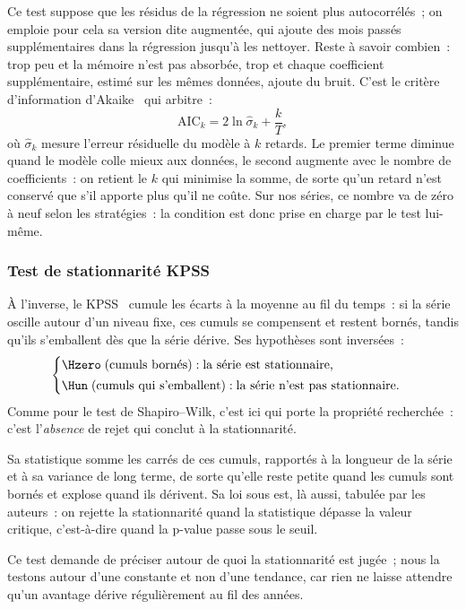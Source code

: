 Ce test suppose que les résidus de la régression ne soient
plus autocorrélés~; on emploie pour cela sa version dite augmentée, qui
ajoute des mois passés supplémentaires dans la régression jusqu'à les
nettoyer. Reste à savoir combien~: trop peu et la mémoire n'est pas absorbée,
trop et chaque coefficient supplémentaire, estimé sur les mêmes données,
ajoute du bruit. C'est le critère d'information d'Akaike~\cite{akaike1974}
qui arbitre~:
\[
  \mathrm{AIC}_k = 2\ln \hat\sigma_k + \frac{k}{T},
\]
où \(\hat\sigma_k\) mesure l'erreur résiduelle du modèle à \(k\) retards.
Le premier terme diminue quand le modèle colle mieux aux données, le second
augmente avec le nombre de coefficients~: on retient le \(k\) qui minimise
la somme, de sorte qu'un retard n'est conservé que s'il apporte plus qu'il
ne coûte. Sur nos séries, ce nombre va de zéro à neuf selon les stratégies~:
la condition est donc prise en charge par le test lui-même.

\subsubsection*{Test de stationnarité KPSS}

À l'inverse, le KPSS~\cite{kpss1992} cumule les écarts à la moyenne au fil du temps~: si la
série oscille autour d'un niveau fixe, ces cumuls se compensent et restent
bornés, tandis qu'ils s'emballent dès que la série dérive. Ses hypothèses
sont inversées~:
\[
  \begin{cases}
    \Hzero \;(\text{cumuls bornés}) : \text{la série est stationnaire,}\\[2pt]
    \Hun \;(\text{cumuls qui s'emballent}) : \text{la série n'est pas stationnaire.}
  \end{cases}
\]
Comme pour le test de Shapiro--Wilk, c'est ici \Hzero{} qui porte la propriété
recherchée~: c'est l'\emph{absence} de rejet qui conclut à la stationnarité.

Sa statistique somme les carrés de ces cumuls, rapportés à la longueur de la
série et à sa variance de long terme, de sorte qu'elle reste petite quand les
cumuls sont bornés et explose quand ils dérivent. Sa loi sous \Hzero{} est,
là aussi, tabulée par les auteurs~: on rejette la stationnarité quand la
statistique dépasse la valeur critique, c'est-à-dire quand la p-value passe
sous le seuil.

Ce test demande de préciser autour de quoi la stationnarité est jugée~; nous
la testons autour d'une constante et non d'une tendance, car rien ne laisse
attendre qu'un avantage dérive régulièrement au fil des années.


